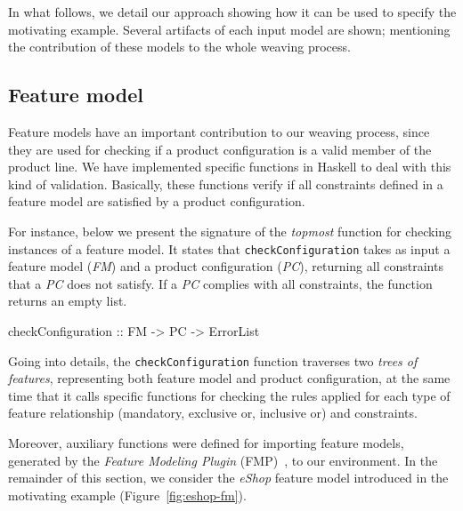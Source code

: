 In what follows, we detail our approach showing
how it can be used to specify the motivating example. Several artifacts of each
input model are shown; mentioning the contribution of these models to the whole
weaving process.




\subsection{Feature model}

Feature models have an important contribution to our weaving process, since they
are used for checking if a product configuration is a valid member of the product
line. We have implemented specific functions in Haskell to deal with
this kind of validation. Basically, these functions verify if all constraints defined in
a feature model are satisfied by a product configuration. 

For instance,  below we present the signature of the \emph{topmost} function
for checking instances of a feature model. It states that
\texttt{checkConfiguration} takes as input a feature model (\emph{FM}) and a
product configuration (\emph{PC}), returning all constraints that a
\emph{PC} does not satisfy. If a \emph{PC} complies with all constraints, the
function returns an empty list.

\begin{code}
checkConfiguration :: FM -> PC -> ErrorList
\end{code}

Going into details, the \texttt{checkConfiguration} function traverses two
\emph{trees of features}, representing both feature model and
product configuration, at the same time that it calls specific functions for
checking the rules applied for each type of feature relationship
(mandatory, exclusive or, inclusive or) and constraints.  

Moreover, auxiliary functions were defined for importing feature models, generated by the
\emph{Feature Modeling Plugin} (FMP)~\cite{Czarnecki:2004aa}, to our
environment. In the remainder of this section, we consider the \emph{eShop}
feature model introduced in the motivating example (Figure~\ref{fig:eshop-fm}). 

